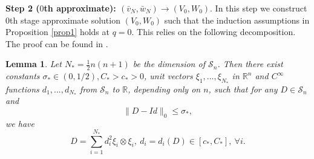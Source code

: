 \documentclass[reqno,12pt]{amsart}
\numberwithin{equation}{section}
\theoremstyle{plain}
\newtheorem{lem}[thm]{Lemma}
\theoremstyle{definition}
\newcommand{\R}{\mathbb{R}}
\renewcommand{\S}{{\mathcal{S}_n}}
\begin{document}
\textbf{Step 2 ($0$th approximate): $(\bar v_N,\bar w_N)\to(V_0,W_0)$}.
In this step we construct $0$th stage approximate solution $(V_0,W_0)$ such that the induction assumptions in Proposition \ref{prop1} holds at $q=0$. This relies on the following decomposition. The proof can be found in \cite[Lemma 5.2]{conti12hprinciple}. 
\begin{lem}\label{lem2}
    Let $N_*=\frac{1}{2}n(n+1)$ be the dimension of $\S$. Then there exist constants $\sigma_*\in(0,1/2), C_*>c_*>0$, unit vectors $ \xi_1,..., \xi_{N_*}$ in $\R^n$ and $C^\infty$ functions $d_1,...,d_{N_*}$ from $\S$ to $\R$, depending only on $n$, such that for any $D\in\S$ and
    \begin{equation*}
	\|D-Id\|_0\le\sigma_*,
    \end{equation*}
    we have
    \begin{equation*}
        D=\sum_{i=1}^{N_*}d_i^2 \xi_i\otimes \xi_i,\ d_i=d_i(D)\in[c_*,C_*],\ \forall i.
    \end{equation*}
\end{lem}
\end{document}
